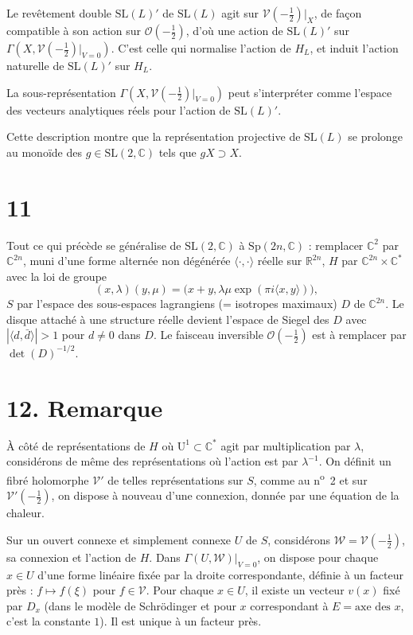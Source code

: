 \documentclass[12pt,a4paper]{article}
\theoremstyle{plain}
\theoremstyle{definition}
\theoremstyle{remark}
\begin{document}
Le revêtement double $\mathrm{SL}(L)'$ de $\mathrm{SL}(L)$ agit sur $\mathscr{V}(-\frac{1}{2})|_X$, de façon compatible à son action sur $\mathcal{O}(-\frac{1}{2})$, d'où une action de $\mathrm{SL}(L)'$ sur $\Gamma(X, \mathscr{V}(-\frac{1}{2})|_{V=0})$. C'est celle qui normalise l'action de $H_L$, et induit l'action naturelle de $\mathrm{SL}(L)'$ sur $H_L$.

La sous-représentation $\Gamma(X, \mathscr{V}(-\frac{1}{2})|_{V=0})$ peut s'interpréter comme l'espace des vecteurs analytiques réels pour l'action de $\mathrm{SL}(L)'$.

Cette description montre que la représentation projective de $\mathrm{SL}(L)$ se prolonge au monoïde des $g \in \mathrm{SL}(2, \mathbb{C})$ tels que $gX \supset X$.

\section*{11}

Tout ce qui précède se généralise de $\mathrm{SL}(2, \mathbb{C})$ à $\mathrm{Sp}(2n, \mathbb{C})$ : remplacer $\mathbb{C}^2$ par $\mathbb{C}^{2n}$, muni d'une forme alternée non dégénérée $\langle \cdot, \cdot \rangle$ réelle sur $\mathbb{R}^{2n}$, $H$ par $\mathbb{C}^{2n} \times \mathbb{C}^*$ avec la loi de groupe
\[(x, \lambda)(y, \mu) = \bigl(x + y, \lambda\mu\exp(\pi i\langle x, y \rangle)\bigr),\]
$S$ par l'espace des sous-espaces lagrangiens (= isotropes maximaux) $D$ de $\mathbb{C}^{2n}$. Le disque attaché à une structure réelle devient l'espace de Siegel des $D$ avec $|\langle d, \bar{d} \rangle| > 1$ pour $d \neq 0$ dans $D$. Le faisceau inversible $\mathcal{O}(-\frac{1}{2})$ est à remplacer par $\det(D)^{-1/2}$.

\section*{12. Remarque}

À côté de représentations de $H$ où $\mathrm{U}^1 \subset \mathbb{C}^*$ agit par multiplication par $\lambda$, considérons de même des représentations où l'action est par $\lambda^{-1}$. On définit un fibré holomorphe $\mathscr{V}'$ de telles représentations sur $S$, comme au n\textsuperscript{o}~2 et sur $\mathscr{V}'(-\frac{1}{2})$, on dispose à nouveau d'une connexion, donnée par une équation de la chaleur.

Sur un ouvert connexe et simplement connexe $U$ de $S$, considérons $\mathscr{W} = \mathscr{V}(-\frac{1}{2})$, sa connexion et l'action de $H$. Dans $\Gamma(U, \mathscr{W})|_{V=0}$, on dispose pour chaque $x \in U$ d'une forme linéaire fixée par la droite correspondante, définie à un facteur près : $f \mapsto f(\xi)$ pour $f \in \mathscr{V}$. Pour chaque $x \in U$, il existe un vecteur $v(x)$ fixé par $D_x$ (dans le modèle de Schrödinger et pour $x$ correspondant à $E = \text{axe des } x$, c'est la constante $1$). Il est unique à un facteur près.
\end{document}
